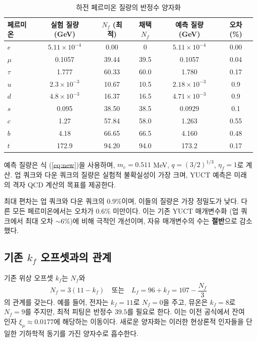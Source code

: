 \documentclass[12pt,a4paper]{article}
\begin{document}
	\begin{table}[H]
		\centering
		\caption{하전 페르미온 질량의 반정수 양자화}
		\label{tab:new_masses}
		\small
		\begin{tabular}{l c c c c c}
			\toprule
			페르미온 & 실험 질량 (GeV) & \(N_f\) (최적) & 채택 \(N_f\) & 예측 질량 (GeV) & 오차 (\%) \\
			\midrule
			\(e\)   & \(5.11\times10^{-4}\) & 0.00  & 0      & \(5.11\times10^{-4}\) & 0.00 \\
			\(\mu\)  & 0.1057                & 39.44 & 39.5   & 0.1057               & 0.04 \\
			\(\tau\) & 1.777                 & 60.33 & 60.0   & 1.780                & 0.17 \\
			\(u\)   & \(2.3\times10^{-3}\)    & 10.67 & 10.5   & \(2.18\times10^{-3}\)  & 0.9 \\
			\(d\)   & \(4.8\times10^{-3}\)    & 16.37 & 16.5   & \(4.71\times10^{-3}\)  & 0.9 \\
			\(s\)   & 0.095                 & 38.50 & 38.5   & 0.0929               & 0.1 \\
			\(c\)   & 1.27                  & 57.84 & 58.0   & 1.263                & 0.55 \\
			\(b\)   & 4.18                  & 66.65 & 66.5   & 4.160                & 0.48 \\
			\(t\)   & 172.9                 & 94.20 & 94.0   & 173.2                & 0.17 \\
			\bottomrule
		\end{tabular}
		\par\smallskip
		\footnotesize 예측 질량은 식 (\ref{eq:new})을 사용하며, \(m_e = 0.511\) MeV, \(q = (3/2)^{1/3}\), \(\eta_f = 1\)로 계산. 업 쿼크와 다운 쿼크의 질량은 실험적 불확실성이 가장 크며, YUCT 예측은 미래의 격자 QCD 계산의 목표를 제공한다.
	\end{table}
	
	최대 편차는 업 쿼크와 다운 쿼크의 0.9\%이며, 이들의 질량은 가장 정밀도가 낮다. 다른 모든 페르미온에서는 오차가 0.6\% 미만이다. 이는 기존 YUCT 매개변수화 (업 쿼크에서 최대 오차 \(\sim 6\%\))에 비해 극적인 개선이며, 자유 매개변수의 수는 \textbf{절반}으로 감소했다.
	
	\subsection{기존 \(k_f\) 오프셋과의 관계}
	
	기존 위상 오프셋 \(k_f\)는 \(N_f\)와
	\begin{equation}
		N_f = 3(11 - k_f) \quad \text{또는} \quad L_f = 96 + k_f = 107 - \frac{N_f}{3}
	\end{equation}
	의 관계를 갖는다. 예를 들어, 전자는 \(k_f = 11\)로 \(N_f = 0\)을 주고, 뮤온은 \(k_f = 8\)로 \(N_f = 9\)를 주지만, 최적 피팅은 반정수 \(39.5\)를 필요로 한다. 이는 이전 공식에서 잔여 인자 \(\xi_\mu \approx 0.0177\)에 해당하는 이동이다. 새로운 양자화는 이러한 현상론적 인자들을 단일한 기하학적 동기를 가진 양자수로 흡수한다.
	
\end{document}
